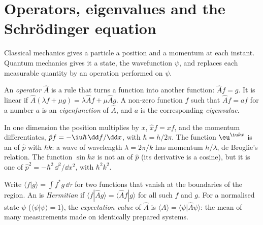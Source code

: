 \section{Operators, eigenvalues and the Schrödinger equation}

Classical mechanics gives a particle a position and a momentum at each
instant. Quantum mechanics gives it a state, the wavefunction $\psi$, and
replaces each measurable quantity by an operation performed on $\psi$.

\begin{definition}\label{def:b3:quantum-model-systems:operator}
An \emph{operator} $\hat A$ is a rule that turns a function
into another function: $\hat A f = g$. It is linear if $\hat A(\lambda f +
\mu g) = \lambda\hat Af + \mu\hat Ag$. A non-zero function $f$ such that
$\hat Af = a f$ for a number $a$ is an \emph{eigenfunction}
of $\hat A$, and $a$ is the corresponding \emph{eigenvalue}.
\end{definition}

\begin{example}\label{ex:b3:quantum-model-systems:xp}
In one dimension the position  multiplies by $x$, $\hat x f = xf$,
and the momentum  differentiates, $\hat p f = -\iu\hbar\,
\dd f/\dd x$, with $\hbar = h/2\pi$. The function $\eu^{\iu kx}$ is an
 of $\hat p$ with  $\hbar k$: a wave of wavelength
$\lambda = 2\pi/k$ has momentum $h/\lambda$, de Broglie's relation.
The function $\sin kx$ is not an  of $\hat p$ (its derivative is
a cosine), but it is one of $\hat p^2 = -\hbar^2\,\dd^2/\dd x^2$, with
 $\hbar^2k^2$.
\end{example}

\begin{definition}\label{def:b3:quantum-model-systems:hermitian}
Write $\langle f|g\rangle = \int f^*g\,\dd\tau$ for two functions that vanish
at the boundaries of the region. An  is \emph{Hermitian}
if $\langle f|\hat Ag\rangle = \langle \hat Af|g\rangle$ for all such
$f$ and $g$. For a normalised state $\psi$ ($\langle\psi|\psi\rangle = 1$), the
\emph{expectation value} of $\hat A$ is
$\langle A\rangle = \langle\psi|\hat A\psi\rangle$: the mean of many
measurements made on identically prepared systems.
\end{definition}

